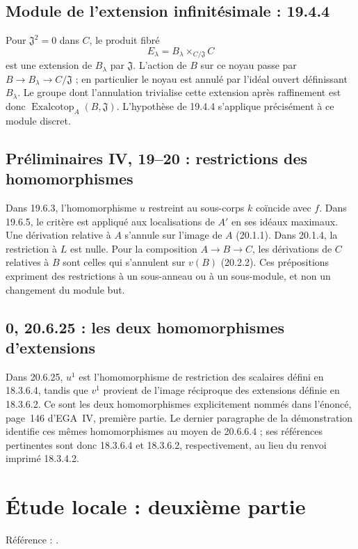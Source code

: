 \documentclass[11pt,a4paper]{article}
\begin{document}
\subsection{Module de l'extension infinitésimale : 19.4.4}
\label{note:iv1-8}
Pour $\mathfrak J^2=0$ dans $C$, le produit fibré
\[
 E_\lambda=B_\lambda\mathbin{\times}_{C/\mathfrak J}C
\]
est une extension de $B_\lambda$ par $\mathfrak J$.
L'action de $B$ sur ce noyau passe par
$B\to B_\lambda\to C/\mathfrak J$ ; en particulier le noyau est
annulé par l'idéal ouvert définissant $B_\lambda$.
Le groupe dont l'annulation trivialise cette extension après
raffinement est donc
$\operatorname{Exalcotop}_A(B,\mathfrak J)$.
L'hypothèse de 19.4.4 s'applique précisément à ce module discret.

\subsection{Préliminaires IV, 19--20 : restrictions des homomorphismes}
\label{note:iv1-domains}
Dans 19.6.3, l'homomorphisme $u$ restreint au sous-corps $k$
coïncide avec $f$. Dans 19.6.5, le critère est appliqué aux
localisations de $A'$ en ses idéaux maximaux.
Une dérivation relative à $A$ s'annule sur l'image de $A$
(20.1.1). Dans 20.1.4, la restriction à $L$ est nulle.
Pour la composition $A\to B\to C$, les dérivations de $C$
relatives à $B$ sont celles qui s'annulent sur $v(B)$ (20.2.2).
Ces prépositions expriment des restrictions à un sous-anneau
ou à un sous-module, et non un changement du module but.
\par

\subsection{0, 20.6.25 : les deux homomorphismes d'extensions}
Dans 20.6.25, $u^1$ est l'homomorphisme de restriction des scalaires
défini en 18.3.6.4, tandis que $v^1$ provient de l'image réciproque
des extensions définie en 18.3.6.2. Ce sont les deux homomorphismes
explicitement nommés dans l'énoncé, page~146 d'EGA~IV, première
partie. Le dernier paragraphe de la démonstration identifie ces
mêmes homomorphismes au moyen de 20.6.6.4 ; ses références
pertinentes sont donc 18.3.6.4 et 18.3.6.2, respectivement,
au lieu du renvoi imprimé 18.3.4.2.

\section{Étude locale : deuxième partie}
\label{part:iv2}
Référence : \cite{EGAIV2}.
\end{document}
